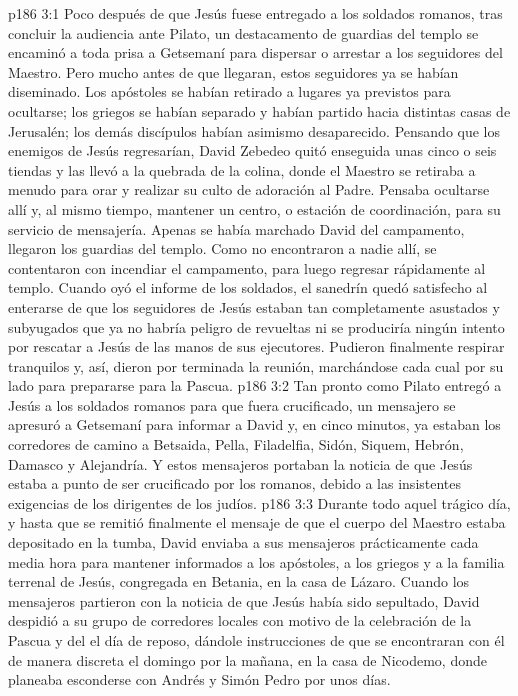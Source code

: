 \vs p186 3:1 Poco después de que Jesús fuese entregado a los soldados romanos, tras concluir la audiencia ante Pilato, un destacamento de guardias del templo se encaminó a toda prisa a Getsemaní para dispersar o arrestar a los seguidores del Maestro. Pero mucho antes de que llegaran, estos seguidores ya se habían diseminado. Los apóstoles se habían retirado a lugares ya previstos para ocultarse; los griegos se habían separado y habían partido hacia distintas casas de Jerusalén; los demás discípulos habían asimismo desaparecido. Pensando que los enemigos de Jesús regresarían, David Zebedeo quitó enseguida unas cinco o seis tiendas y las llevó a la quebrada de la colina, donde el Maestro se retiraba a menudo para orar y realizar su culto de adoración al Padre. Pensaba ocultarse allí y, al mismo tiempo, mantener un centro, o estación de coordinación, para su servicio de mensajería. Apenas se había marchado David del campamento, llegaron los guardias del templo. Como no encontraron a nadie allí, se contentaron con incendiar el campamento, para luego regresar rápidamente al templo. Cuando oyó el informe de los soldados, el sanedrín quedó satisfecho al enterarse de que los seguidores de Jesús estaban tan completamente asustados y subyugados que ya no habría peligro de revueltas ni se produciría ningún intento por rescatar a Jesús de las manos de sus ejecutores. Pudieron finalmente respirar tranquilos y, así, dieron por terminada la reunión, marchándose cada cual por su lado para prepararse para la Pascua.
\vs p186 3:2 Tan pronto como Pilato entregó a Jesús a los soldados romanos para que fuera crucificado, un mensajero se apresuró a Getsemaní para informar a David y, en cinco minutos, ya estaban los corredores de camino a Betsaida, Pella, Filadelfia, Sidón, Siquem, Hebrón, Damasco y Alejandría. Y estos mensajeros portaban la noticia de que Jesús estaba a punto de ser crucificado por los romanos, debido a las insistentes exigencias de los dirigentes de los judíos.
\vs p186 3:3 Durante todo aquel trágico día, y hasta que se remitió finalmente el mensaje de que el cuerpo del Maestro estaba depositado en la tumba, David enviaba a sus mensajeros prácticamente cada media hora para mantener informados a los apóstoles, a los griegos y a la familia terrenal de Jesús, congregada en Betania, en la casa de Lázaro. Cuando los mensajeros partieron con la noticia de que Jesús había sido sepultado, David despidió a su grupo de corredores locales con motivo de la celebración de la Pascua y del  el día de reposo, dándole instrucciones de que se encontraran con él de manera discreta el domingo por la mañana, en la casa de Nicodemo, donde planeaba esconderse con Andrés y Simón Pedro por unos días.
